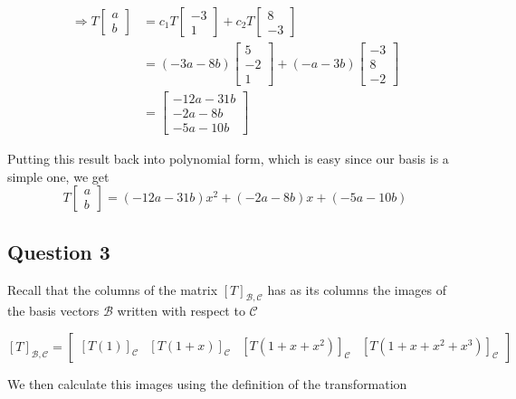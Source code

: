 \documentclass{article}
\begin{document}
\begin{align*}
    \Rightarrow T\begin{bmatrix}
    a \\ b
    \end{bmatrix} &= c_1 T \begin{bmatrix}
        -3 \\ 1
    \end{bmatrix} + c_2 T \begin{bmatrix}
        8 \\ -3
    \end{bmatrix} \\
    &= (-3a -8b)\begin{bmatrix}
        5 \\ -2 \\ 1
    \end{bmatrix} + (-a -3b)\begin{bmatrix}
        -3 \\ 8 \\ -2
    \end{bmatrix} \\
    &= \begin{bmatrix}
        -12a -31b \\
        -2a -8b \\
        -5a -10b
    \end{bmatrix}
\end{align*}

Putting this result back into polynomial form, which is easy since our basis is a simple one, we get
\[
T \begin{bmatrix}
    a \\ b
\end{bmatrix} = (-12a-31b)x^2 + (-2a -8b)x + (-5a -10b)
\]

\subsection*{Question 3}

Recall that the columns of the matrix \([T]_{\mathcal{B}, \mathcal{C}}\) has as its columns the images
of the basis vectors \(\mathcal{B}\) written with respect to \(\mathcal{C}\)

\[
[T]_{\mathcal{B}, \mathcal{C}} = \begin{bmatrix}
    [T(1)]_\mathcal{C} & [T(1 + x)]_\mathcal{C} & [T(1+x+x^2)]_\mathcal{C} & [T(1+x+x^2+x^3)]_\mathcal{C}
\end{bmatrix}
\]

We then calculate this images using the definition of the transformation
\end{document}
